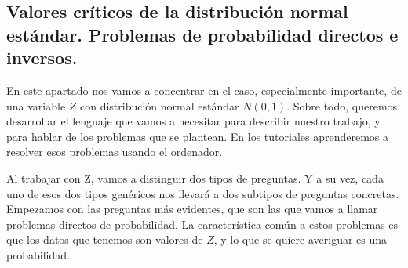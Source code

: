 %
%
\subsection{Valores críticos de la distribución normal estándar. Problemas de probabilidad directos e inversos.}
\label{cap06:subsec:valoresCriticosZ}

En este apartado nos vamos a concentrar en el caso, especialmente importante, de una variable $Z$ con distribución normal estándar $N(0,1)$. Sobre todo, queremos desarrollar el lenguaje que vamos a necesitar para describir nuestro trabajo, y para hablar de los problemas que se plantean. En los tutoriales aprenderemos a resolver esos problemas usando el ordenador.

Al trabajar con Z, vamos a distinguir dos tipos de preguntas. Y a su vez, cada
uno de esos dos tipos genéricos nos llevará a dos subtipos de preguntas
concretas. Empezamos con las preguntas más evidentes, que son las que vamos a llamar {\sf
problemas directos} de probabilidad. La
característica común a estos problemas es que los datos que tenemos son {\sf
valores} de $Z$, y lo que se quiere averiguar es una {\sf probabilidad}.

